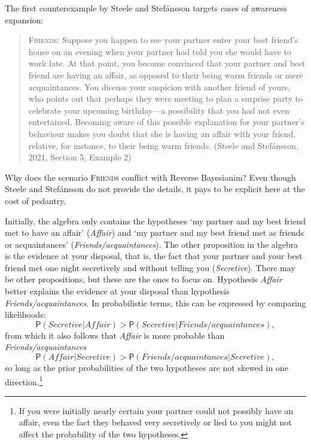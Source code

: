 \documentclass[
  11pt,
  dvipsnames,enabledeprecatedfontcommands]{scrartcl}
\newcommand{\pr}[1]{\ensuremath{\mathsf{P}(#1)}}
\begin{document}
The first counterexample by Steele and Stefánsson targets cases of
awareness expansion:

\begin{quote}
\textsc{Friends}: Suppose you happen to see your partner enter your best
friend's house on an evening when your partner had told you she would
have to work late. At that point, you become convinced that your partner
and best friend are having an affair, as opposed to their being warm
friends or mere acquaintances. You discuss your suspicion with another
friend of yours, who points out that perhaps they were meeting to plan a
surprise party to celebrate your upcoming birthday---a possibility that
you had not even entertained. Becoming aware of this possible
explanation for your partner's behaviour makes you doubt that she is
having an affair with your friend, relative, for instance, to their
being warm friends. (Steele and Stefánsson, 2021, Section 5, Example 2)
\end{quote}

\noindent Why does the scenario \textsc{Friends} conflict with Reverse
Bayesianim? Even though Steele and Stefánsson do not provide the
details, it pays to be explicit here at the cost of pedantry.

Initially, the algebra only contains the hypotheses `my partner and my
best friend met to have an affair' (\textit{Affair}) and `my partner and
my best friend met as friends or acquaintances'
(\textit{Friends/acquaintances}). The other proposition in the algebra
is the evidence at your disposal, that is, the fact that your partner
and your best friend met one night secretively and without telling you
(\textit{Secretive}). There may be other propositions, but these are the
ones to focus on. Hypothesis \textit{Affair} better explains the
evidence at your disposal than hypothesis
\textit{Friends/acquaintances}. In probabilistic terms, this can be
expressed by comparing likelihoods:
\[\pr{ \textit{Secretive} \vert \textit{Affair}}> \pr{\textit{Secretive} \vert \textit{Friends/acquaintances}},\]
from which it also follows that \textit{Affair} is more probable than
\textit{Friends/acquaintances}
\[\pr{\textit{Affair} \vert  \textit{Secretive} }> \pr{\textit{Friends/acquaintances} \vert \textit{Secretive}}, \tag{>}\]
so long as the prior probabilities of the two hypotheses are not skewed
in one direction.\footnote{If you were initially nearly certain your
  partner could not possibly have an affair, even the fact they behaved
  very secretively or lied to you might not affect the probability of
  the two hypotheses.}
\end{document}

